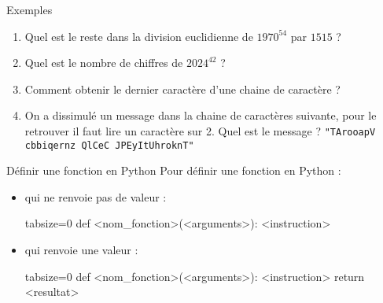 \documentclass[10pt]{beamer}
\begin{document}
\begin{frame}[fragile]{\Ctitle}{\stitle}
	\begin{exampleblock}{Exemples}
		\begin{enumerate}
			\item<1-> Quel est le reste dans la division euclidienne de $1970^{54}$ par $1515$ ?
			\item<2-> Quel est le nombre de chiffres de $2024^{42}$ ?
			\item<3-> Comment obtenir le dernier caractère d'une chaine de caractère ?
			\item<4-> On a dissimulé un message dans la chaine de caractères suivante, pour le retrouver il faut lire un caractère sur 2. Quel est le message ?
				\texttt{"TArooapV cbbiqernz QlCeC JPEyItUhroknT"}
		\end{enumerate}
	\end{exampleblock}
\end{frame}

\begin{frame}[fragile]{\Ctitle}{\stitle}
	\begin{alertblock}{Définir une fonction en Python}
		Pour définir une fonction en Python :
		\begin{itemize}
			\item<2-> qui ne renvoie pas de valeur :
				\begin{codepython*}{tabsize=0}
					def <nom_fonction>(<arguments>):
					<instruction>
				\end{codepython*}
			\item<2-> qui renvoie une valeur : \begin{codepython*}{tabsize=0}
					def <nom_fonction>(<arguments>):
					<instruction>
					return <resultat>
				\end{codepython*}
		\end{itemize}
	\end{alertblock}
\end{frame}
\end{document}
